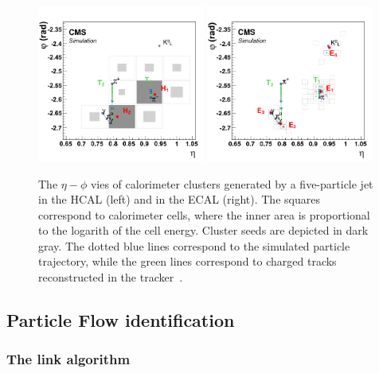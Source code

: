 \begin{figure}[h] 
    \centering
    \includegraphics[width=0.49\textwidth]{figures/event_reconstruction/PF_HCAL.png}
    \includegraphics[width=0.49\textwidth]{figures/event_reconstruction/PF_ECAL.png}
    \caption{The $\eta-\phi$ vies of calorimeter clusters generated by a five-particle jet in the HCAL (left) and in the ECAL (right). The squares correspond to calorimeter cells, where the inner area is proportional to the logarith of the cell energy. Cluster seeds are depicted in dark gray. The dotted blue lines correspond to the simulated particle trajectory, while the green lines correspond to charged tracks reconstructed in the tracker~\cite{1748-0221-12-10-P10003}.}
    \label{fig:objreco:caloclustering}
\end{figure} 


\subsection{Particle Flow identification}

\subsubsection{The link algorithm}

